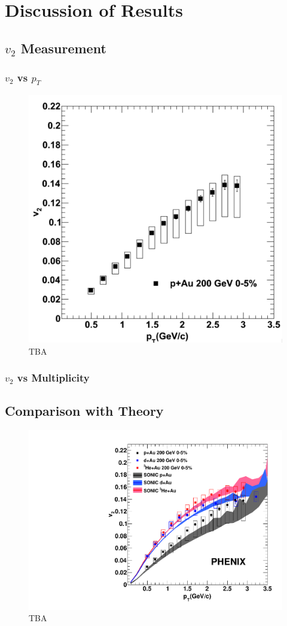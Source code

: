 \chapter{Discussion of Results}
\section{$v_2$ Measurement}
\subsection{$v_2$ vs $p_T$}
\begin{figure}
\begin{center}
\includegraphics[width=0.5\linewidth]{figs/pau_points.png}
\caption{TBA}
\end{center}
\end{figure}
\subsection{$v_2$ vs Multiplicity}
\section{Comparison with Theory}
\begin{figure}
\begin{center}
\includegraphics[width=0.5\linewidth]{figs/three_system_comparison_result.pdf}
\caption{TBA}
\end{center}
\end{figure}
